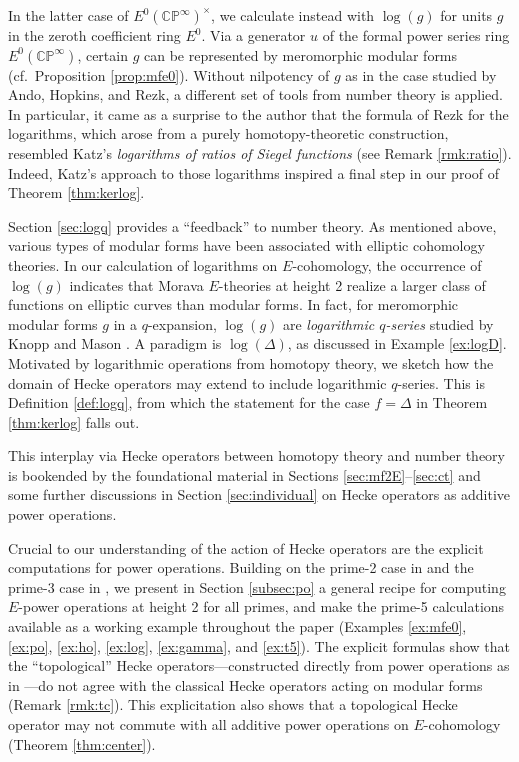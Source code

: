\documentclass{gtpart}
\theoremstyle{definition}
\theoremstyle{remark}
\newcommand{\mb}[1]{\mathbb{#1}}
\newcommand{\BC}{{\mb C}}
\newcommand{\BP}{{\mb P}}
\renewcommand{\D}{\Delta}
\renewcommand{\=}{\approx}
\renewcommand{\-}{\sim}
\numberwithin{equation}{section}
\numberwithin{thm}{section}
\begin{document}
In the latter case of $E^0(\BC\BP^\infty)^\times$, we calculate instead with $\log(g)$ for units $g$ in the zeroth coefficient ring $E^0$.  
Via a generator $u$ of the formal power series ring $E^0(\BC\BP^\infty)$, 
certain $g$ can be represented by meromorphic modular forms (cf.~Proposition \ref{prop:mfe0}).  
Without nilpotency of $g$ as in the case studied by Ando, Hopkins, and Rezk, 
a different set of tools from number theory is applied.  
In particular, it came as a surprise to the author that the formula of Rezk for the 
logarithms, which arose from a purely homotopy-theoretic construction, resembled Katz's 
{\em logarithms of ratios of Siegel functions} \cite[Section 10.1]{padicinterp} (see Remark \ref{rmk:ratio}).  
Indeed, Katz's approach to those logarithms inspired a final step in our proof of 
Theorem \ref{thm:kerlog}.  

Section \ref{sec:logq} provides a ``feedback'' to number theory.  
As mentioned above, various types of modular forms have been associated with elliptic cohomology theories.  
In our calculation 
of logarithms on $E$-cohomology, the occurrence of $\log(g)$ indicates that Morava 
$E$-theories at height 2 realize a larger class of functions on elliptic curves than modular forms.  In fact, 
for meromorphic modular forms $g$ in a $q$-expansion, $\log(g)$ 
are {\em logarithmic $q$-series} studied by Knopp and Mason \cite{KnoppMason}.  
A paradigm is $\log(\D)$, as discussed in Example \ref{ex:logD}.  Motivated 
by logarithmic operations from homotopy theory, we sketch how the domain of Hecke operators 
may extend to include logarithmic $q$-series.  This is Definition \ref{def:logq}, from which the 
statement for the case $f = \D$ in Theorem \ref{thm:kerlog} falls out.  

This interplay via Hecke operators between homotopy theory and number theory 
is bookended by the foundational material in Sections \ref{sec:mf2E}--\ref{sec:ct} 
and some further discussions in Section \ref{sec:individual} on Hecke operators as additive power operations.  

Crucial to our understanding of the action of Hecke operators are 
the explicit computations for power operations.  
Building on the prime-2 case in \cite{h2p2} and the prime-3 case in \cite{p3}, we present in Section \ref{subsec:po} a general recipe for computing 
$E$-power operations at height 2 for all primes, and make the prime-5 calculations available 
as a working example throughout the paper (Examples \ref{ex:mfe0}, \ref{ex:po}, 
\ref{ex:ho}, \ref{ex:log}, \ref{ex:gamma}, and \ref{ex:t5}).  The explicit formulas 
show that the ``topological'' Hecke operators---constructed directly from power 
operations as in \cite[Proposition 3.6.2]{Ando95}---do not agree with the 
classical Hecke operators acting on modular forms (Remark \ref{rmk:tc}).  This explicitation also 
shows that a topological Hecke operator may not commute with all additive power 
operations on $E$-cohomology (Theorem \ref{thm:center}).  
\end{document}
